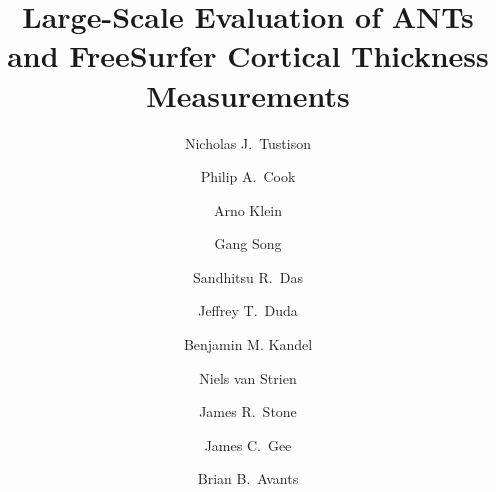 \documentclass[final,5p,times,twocolumn]{elsarticle}
\begin{document}
\begin{frontmatter}

\title{Large-Scale Evaluation of ANTs and FreeSurfer Cortical Thickness Measurements}


\author[label1]{Nicholas J.~Tustison
  }
\author[label2]{Philip A.~Cook}
\author[label3]{Arno Klein}
\author[label2]{Gang Song}
\author[label2]{Sandhitsu R.~Das}
\author[label2]{Jeffrey T.~Duda}
\author[label2]{Benjamin M. Kandel}
\author[label3]{Niels van Strien}
\author[label1]{James R.~Stone}
\author[label2]{James C.~Gee}
\author[label2]{Brian B.~Avants}
\address[label1]{Department of Radiology and Medical Imaging, University of Virginia, Charlottesville, VA}
\address[label2]{Penn Image Computing and Science Laboratory, University of Pennsylvania,
                Philadelphia, PA}
\address[label3]{Sage Bionetworks, Seattle, WA}  
\address[label4]{Department of Circulation and Medical Imaging,
  Norwegian University of Science and Technology, Trondheim,
  Norway}
  








\end{frontmatter}
\end{document}
